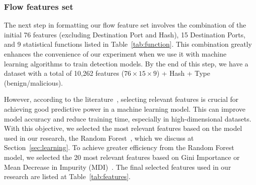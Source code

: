 \subsubsection{Flow features set}\label{sec:set}

The next step in formatting our flow feature set involves the combination of the initial 76 features (excluding Destination Port and Hash), 15 Destination Ports, and 9 statistical functions listed in Table~\ref{tab:function}. This combination greatly enhances the convenience of our experiment when we use it with machine learning algorithms to train detection models. By the end of this step, we have a dataset with a total of 10,262 features ($76\times15\times9$) + Hash + Type (benign/malicious).

However, according to the literature~\cite{DBLP:conf/ichmi/Xie22,DBLP:journals/mta/AmiriebrahimabadiM24}, selecting relevant features is crucial for achieving good predictive power in a machine learning model. This can improve model accuracy and reduce training time, especially in high-dimensional datasets. With this objective, we selected the most relevant features based on the model used in our research, the Random Forest~\cite{james2023introduction}, which we discuss at Section~\ref{sec:learning}. To achieve greater efficiency from the Random Forest model, we selected the 20 most relevant features based on Gini Importance or Mean Decrease in Impurity (MDI)~\cite{james2023introduction}. The final selected features used in our research are listed at Table~\ref{tab:features}.

